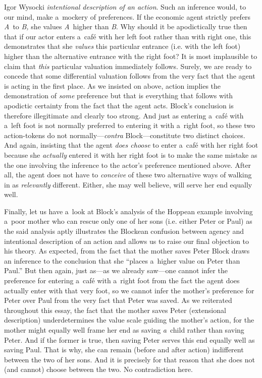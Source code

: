 \begin{artengenv}{Igor Wysocki}
{ \textit{intentional description of an action}. } Such an inference would, to our mind, make a~mockery of preferences. If the economic agent strictly prefers \textit{A}~to \textit{B,} she values \textit{A}~higher than \textit{B}. Why should it be apodictically true then that if our actor enters a~café with her left foot rather than with right one, this demonstrates that she \textit{values} this particular entrance (i.e. with the left foot) higher than the alternative entrance with the right foot? It is most implausible to claim that \textit{this} particular valuation immediately follows. Surely, we are ready to concede that some differential valuation follows from the very fact that the agent is acting in the first place. As we insisted on above, action implies the demonstration of \textit{some} preference but that is everything that follows with apodictic certainty from the fact that the agent acts. Block's conclusion is therefore illegitimate and clearly too strong. And just as entering a~café with a~left foot is not normally preferred to entering it with a~right foot, so these two action-tokens do not normally---\textit{contra} Block---constitute two distinct choices. And again, insisting that the agent \textit{does choose} to enter a~café with her right foot because she \textit{actually} entered it with her right foot is to make the same mistake as the one involving the inference to the actor's preference mentioned above. After all, the agent does not have to \textit{conceive} of these two alternative ways of walking in as \textit{relevantly} different. Either, she may well believe, will serve her end equally well.



Finally, let us have a~look at Block's 
\parencite*[][pp.50–51]{block_response_2022} %
 analysis of the Hoppean example involving a~poor mother who can rescue only one of her sons (i.e. either Peter or Paul) as the said analysis aptly illustrates the Blockean confusion between agency and intentional description of an action and allows us to raise our final objection to his theory. As expected, from the fact that the mother saves Peter Block draws an inference to the conclusion that she ``places a~higher value on Peter than Paul.'' But then again, just as---as we already saw---one cannot infer the preference for entering a~café with a~right foot from the fact the agent does actually enter with that very foot, so we cannot infer the mother's preference for Peter over Paul from the very fact that Peter was saved. As we reiterated throughout this essay, the fact that the mother saves Peter (extensional description) underdetermines the value scale guiding the mother's action, for the mother might equally well frame her end as saving \textit{a}~child rather than saving Peter. And if the former is true, then saving Peter serves this end equally well as saving Paul. That is why, she can remain (before and after action) indifferent between the two of her sons. And it is precisely for that reason that she does not (and cannot) choose between the two. No contradiction here.




\end{artengenv}
